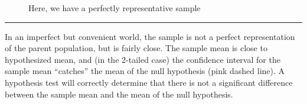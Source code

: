 \documentclass[
  letterpaper,
  DIV=11,
  numbers=noendperiod]{scrreprt}
\begin{document}
\begin{figure}


\caption{\label{fig-5-5.perfectly_representative_sample}Here, we have a
perfectly representative sample}

\end{figure}%

\begin{center}\rule{0.5\linewidth}{0.5pt}\end{center}

In an imperfect but convenient world, the sample is not a perfect
representation of the parent population, but is fairly close. The sample
mean is close to hypothesized mean, and (in the 2-tailed case) the
confidence interval for the sample mean ``catches'' the mean of the null
hypothesis (pink dashed line). A hypothesis test will correctly
determine that there is not a significant difference between the sample
mean and the mean of the null hypothesis.
\end{document}
